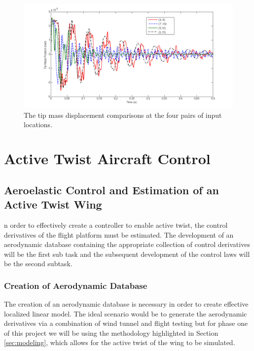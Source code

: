 \documentclass[11pt]{ucthesis}
\begin{document}
\begin{figure}[h]
\centering
\includegraphics[width=1\linewidth]{Figures/twoinput_tip.png}
\caption{The tip mass displacement comparisons at the four pairs of input locations.}
\label{twosystemP}
\end{figure}

\section{Active Twist Aircraft Control}
\subsection{Aeroelastic Control and Estimation of an Active Twist Wing}
n order to effectively create a controller to enable active twist, the control derivatives of the flight platform must be estimated. The development of an aerodynamic database containing the appropriate collection of control derivatives will be the first sub task and the subsequent development of the control laws will be the second subtask.

\subsubsection{Creation of Aerodynamic Database}
The creation of an aerodynamic database is necessary in order to create effective localized linear model. The ideal scenario would be to generate the aerodynamic derivatives via a combination of wind tunnel and flight testing but for phase one of this project we will be using the methodology highlighted in Section \ref{sec:modeling}, which allows for the active twist of the wing to be simulated.
\end{document}
